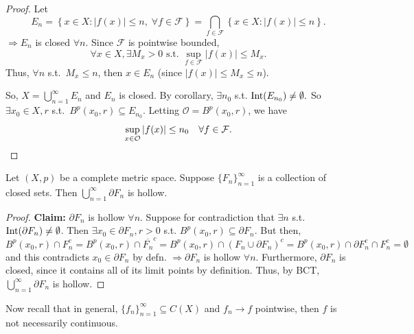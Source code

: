 \begin{proof}
    Let
    \[
        E_n = \left\{ x \in X : \left| f(x) \right| \leq n, \; \forall f \in \mathcal{F} \right\} 
        = \bigcap_{f\in \mathcal{F}} \left\{ x \in X : \left| f(x) \right| \leq n  \right\}.
    \]
    $\Rightarrow E_n$ is closed $\forall n$. Since $\mathcal{F}$ is pointwise bounded,
    \[
        \forall x \in X, \exists M_x > 0 \text{ s.t. } \sup_{ f \in \mathcal{F}} \left| f(x) \right|
         \leq M_x.
    \]
    Thus, $\forall n$ s.t.\ $M_x \leq n$, then $x \in E_n$ (since $\left| f(x) \right| \leq M_x \leq n$).
    
    So, $X = \bigcup_{n=1}^{\infty} E_n$ and $E_n$ is closed. By corollary, $\exists n_0$ s.t.
    $\operatorname{Int}(E_{n_0}) \neq \emptyset.$
    So $\exists x_0 \in X, r$ s.t.\ $B^p(x_0, r) \subseteq E_{n_0}$. Letting $\mathcal{O} = 
    B^p(x_0, r)$, we have
    \[
        \sup_{x \in \mathcal{O}} \left| f(x) \right| \leq n_0 \quad \forall f \in \mathcal{F}. \qedhere
    \]
\end{proof}

\begin{cor}
    Let $(X, p)$ be a complete metric space. Suppose $\{F_{n}\}_{n=1}^{\infty} $ is a collection
    of closed sets. Then $\bigcup_{n=1}^{\infty} \partial F_n$  is hollow.
\end{cor}
\begin{proof}
    \textbf{Claim:} $\partial F_n$ is hollow $\forall n$. Suppose for contradiction that
    $\exists n$ s.t. $\operatorname{Int} (\partial F_n) \neq \emptyset$. Then $\exists x_0 \in
    \partial F_n, r > 0$ s.t. $B^p(x_0, r) \subseteq \partial F_n$. But then,
    \[
        B^p(x_0, r) \cap F_n^c = B^p(x_0, r) \cap \overline{F_n}^c = B^p(x_0, r) \cap 
        (F_n \cup \partial F_n)^c = B^p(x_0, r) \cap \partial F_n^c \cap F_n^c = \emptyset
    \]       
    and this contradicts $x_0 \in \partial F_n$ by defn. $\Rightarrow \partial F_n$ is hollow 
    $\forall n$.
    Furthermore, $\partial F_n$ is closed, since it contains all of its limit points by definition.
    Thus, by BCT, $\bigcup_{n=1}^{\infty} \partial F_n$ is hollow.    
\end{proof}

\noindent Now recall that in general, $\{f_{n}\}_{n=1}^{\infty} \subseteq C(X)$ and $f_n \to f$ 
pointwise, then $f$  is not necessarily continuous.  

